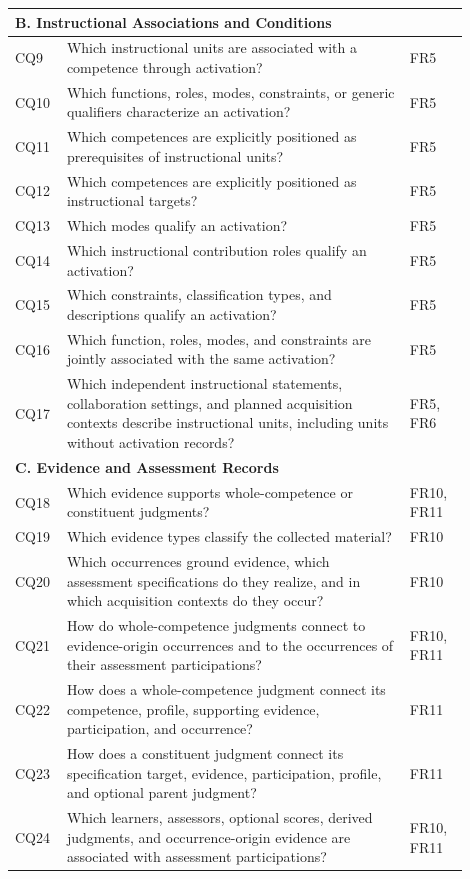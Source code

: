 \begin{longtable}{p{0.08\linewidth} p{0.70\linewidth} p{0.12\linewidth}}
\midrule
\multicolumn{3}{l}{\textbf{B. Instructional Associations and Conditions}} \\
\midrule
CQ9 & Which instructional units are associated with a competence through activation? & FR5 \\
CQ10 & Which functions, roles, modes, constraints, or generic qualifiers characterize an activation? & FR5 \\
CQ11 & Which competences are explicitly positioned as prerequisites of instructional units? & FR5 \\
CQ12 & Which competences are explicitly positioned as instructional targets? & FR5 \\
CQ13 & Which modes qualify an activation? & FR5 \\
CQ14 & Which instructional contribution roles qualify an activation? & FR5 \\
CQ15 & Which constraints, classification types, and descriptions qualify an activation? & FR5 \\
CQ16 & Which function, roles, modes, and constraints are jointly associated with the same activation? & FR5 \\
CQ17 & Which independent instructional statements, collaboration settings, and planned acquisition contexts describe instructional units, including units without activation records? & FR5, FR6 \\
\midrule
\multicolumn{3}{l}{\textbf{C. Evidence and Assessment Records}} \\
\midrule
CQ18 & Which evidence supports whole-competence or constituent judgments? & FR10, FR11 \\
CQ19 & Which evidence types classify the collected material? & FR10 \\
CQ20 & Which occurrences ground evidence, which assessment specifications do they realize, and in which acquisition contexts do they occur? & FR10 \\
CQ21 & How do whole-competence judgments connect to evidence-origin occurrences and to the occurrences of their assessment participations? & FR10, FR11 \\
CQ22 & How does a whole-competence judgment connect its competence, profile, supporting evidence, participation, and occurrence? & FR11 \\
CQ23 & How does a constituent judgment connect its specification target, evidence, participation, profile, and optional parent judgment? & FR11 \\
CQ24 & Which learners, assessors, optional scores, derived judgments, and occurrence-origin evidence are associated with assessment participations? & FR10, FR11 \\

\end{longtable}

